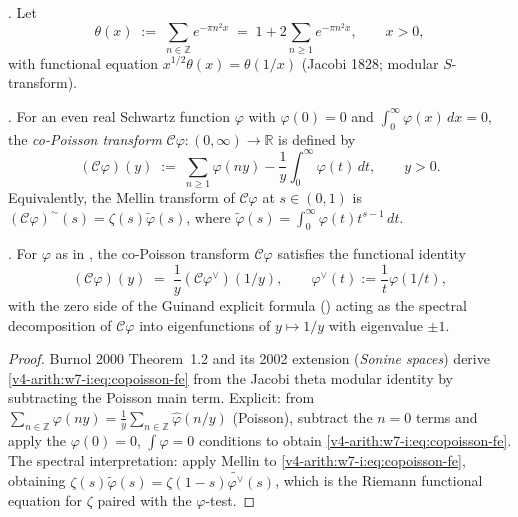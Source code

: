 \begin{definition}
\label{v4-arith:w7-i:def:theta}
\ClaimStatusDefinitional. Let
\begin{equation}
\label{v4-arith:w7-i:eq:theta}
\theta(x)\;:=\;\sum_{n\in\mathbb{Z}}e^{-\pi n^{2}x}
\;=\;1+2\sum_{n\geq 1}e^{-\pi n^{2}x},\qquad x>0,
\end{equation}
with functional equation
\(x^{1/2}\theta(x)=\theta(1/x)\) (Jacobi 1828; modular \(S\)-transform).
\end{definition}

\begin{definition}
\label{v4-arith:w7-i:def:copoisson}
\ClaimStatusDefinitional. For an even real Schwartz function
\(\varphi\) with \(\varphi(0)=0\) and
\(\int_{0}^{\infty}\varphi(x)\,dx=0\), the \emph{co-Poisson transform}
\(\mathcal{C}\varphi\colon(0,\infty)\to\mathbb{R}\) is defined by
\begin{equation}
\label{v4-arith:w7-i:eq:copoisson}
(\mathcal{C}\varphi)(y)\;:=\;\sum_{n\geq 1}\varphi(ny)-\frac{1}{y}\int_{0}^{\infty}\varphi(t)\,dt,\qquad y>0.
\end{equation}
Equivalently, the Mellin transform of \(\mathcal{C}\varphi\) at
\(s\in(0,1)\) is
\((\mathcal{C}\varphi)^{\sim}(s)=\zeta(s)\widetilde{\varphi}(s)\), where
\(\widetilde{\varphi}(s)=\int_{0}^{\infty}\varphi(t)t^{s-1}\,dt\).
\end{definition}

\begin{theorem}
\label{v4-arith:w7-i:thm:burnol-copoisson}
\ClaimStatusProvedElsewhere. For \(\varphi\) as in
, the co-Poisson transform
\(\mathcal{C}\varphi\) satisfies the functional identity
\begin{equation}
\label{v4-arith:w7-i:eq:copoisson-fe}
(\mathcal{C}\varphi)(y)\;=\;\frac{1}{y}(\mathcal{C}\varphi^{\vee})(1/y),
\qquad
\varphi^{\vee}(t):=\frac{1}{t}\varphi(1/t),
\end{equation}
with the zero side of the Guinand explicit formula
() acting as the spectral
decomposition of \(\mathcal{C}\varphi\) into eigenfunctions of
\(y\mapsto 1/y\) with eigenvalue \(\pm 1\).
\end{theorem}

\begin{proof}
Burnol 2000 Theorem~1.2 and its 2002 extension (\emph{Sonine spaces})
derive \eqref{v4-arith:w7-i:eq:copoisson-fe} from the Jacobi
theta modular identity by subtracting the Poisson main term.
Explicit: from \(\sum_{n\in\mathbb{Z}}\varphi(ny)
=\frac{1}{y}\sum_{n\in\mathbb{Z}}\widehat{\varphi}(n/y)\) (Poisson),
subtract the \(n=0\) terms and apply the \(\varphi(0)=0\),
\(\int\varphi=0\) conditions to obtain
\eqref{v4-arith:w7-i:eq:copoisson-fe}.
The spectral interpretation: apply Mellin to
\eqref{v4-arith:w7-i:eq:copoisson-fe}, obtaining
\(\zeta(s)\widetilde{\varphi}(s)=\zeta(1-s)\widetilde{\varphi^{\vee}}(s)\),
which is the Riemann functional equation for \(\zeta\) paired with
the \(\varphi\)-test.
\end{proof}

